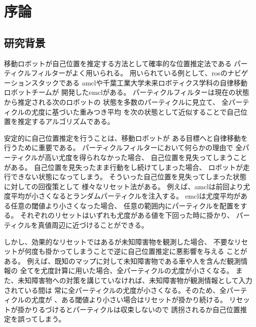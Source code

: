 \chapter{序論}
\section{研究背景}
移動ロボットが自己位置を推定する方法として確率的な位置推定法である
パーティクルフィルターがよく用いられる。
用いられている例として、rosのナビゲーションスタックである
amcl\cite{amcl_github}や千葉工業大学未来ロボティクス学科の自律移動ロボットチームが
開発したemcl\cite{emcl_github}がある。
パーティクルフィルターは現在の状態から推定される次のロボットの
状態を多数のパーティクルに見立て、
全パーティクルの尤度に基づいた重みつき平均
を次の状態として近似することで自己位置を推定するアルゴリズムである。

安定的に自己位置推定を行うことは、移動ロボットが
ある目標へと自律移動を行うために重要である。
パーティクルフィルターにおいて何らかの理由で
全パーティクルが高い尤度を得られなかった場合、
自己位置を見失ってしまうことがある。
自己位置を見失ったまま行動をし続けてしまった場合、
ロボットが走行できない状態になってしまう。
そういった自己位置を見失ってしまった状態に対しての回復策として
様々なリセット法がある。
例えば、amclは前回より尤度平均が小さくなるとランダムパーティクルを注入する。
emclは尤度平均がある任意の閾値より小さくなった場合、
任意の範囲内にパーティクルを配置をする\cite{ueda2004iros}。
それぞれのリセットはいずれも尤度がある値を下回った時に掛かり、
パーティクルを真値周辺に近づけることができる。

しかし、効果的なリセットではあるが未知障害物を観測した場合、
不要なリセットが何度も掛かってしまうことで逆に自己位置推定に悪影響を与える
ことがある。
例えば、既知のマップに対して未知障害物である車や人を含んだ観測情報の
全てを尤度計算に用いた場合、全パーティクルの尤度が小さくなる。
また、未知障害物への対策を講じていなければ、未知障害物が観測情報として入力されている間は
常に全パーティクルの尤度が小さくなる。そのため、全パーティクルの尤度が
、ある閾値より小さい場合はリセットが掛かり続ける。
リセットが掛かりるづけるとパーティクルは収束しないので
誘拐されるか自己位置推定を誤ってしまう。

